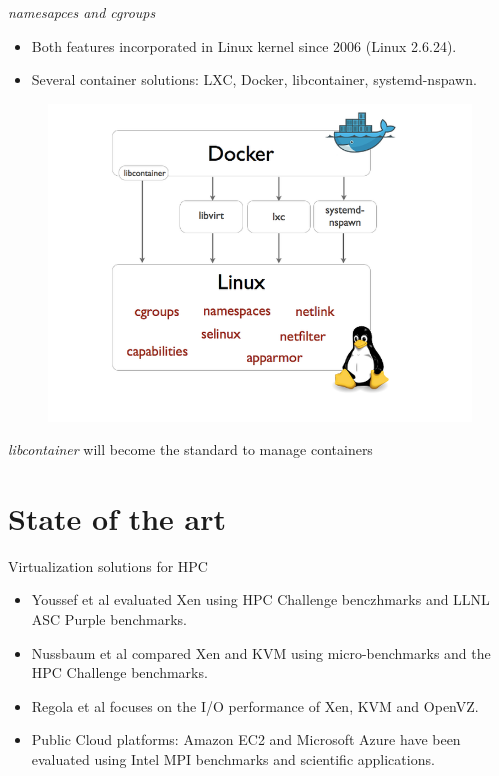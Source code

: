 \documentclass[presentation]{beamer}
\begin{document}
\begin{frame}[label=sec-1-4]{\emph{namesapces and cgroups}}
\begin{itemize}
\item Both features incorporated in Linux kernel since 2006 (Linux 2.6.24).
\item Several container solutions: LXC, Docker, libcontainer, systemd-nspawn.
\end{itemize}

\begin{figure}[!h]
  \center
  \includegraphics[scale=0.20]{figures/libcontainer-diagram.png}
  \label{fig:hpc}
\end{figure}

\emph{libcontainer} \alert{will become the standard to manage containers}
\end{frame}



\section{State of the art}
\label{sec-2}
\begin{frame}[label=sec-2-1]{Virtualization solutions for HPC}
\begin{itemize}
\item Youssef et al\cite{Youseff:2006:EPI:1308175.1308346} evaluated Xen using HPC
Challenge benczhmarks and LLNL ASC Purple benchmarks.

\item Nussbaum et al\cite{nussbaum2009linux} compared Xen and KVM using
micro-benchmarks and the HPC Challenge benchmarks.

\item Regola et al\cite{regola2010recommendations} focuses on the I/O
performance of Xen, KVM and OpenVZ.

\item Public Cloud platforms: Amazon EC2 \cite{5353067} and Microsoft Azure\cite{Tudoran:2012:PEA:2168697.2168701}
  have been evaluated using Intel MPI benchmarks and scientific applications.
\end{itemize}
\end{frame}
\end{document}
